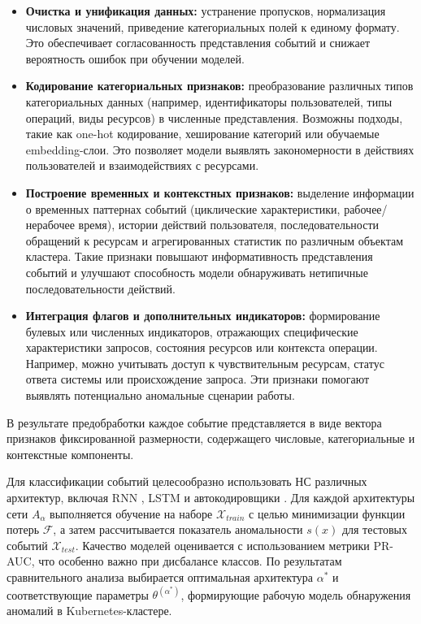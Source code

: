 \begin{itemize}
    \item \textbf{Очистка и унификация данных:} устранение пропусков, нормализация числовых значений, приведение категориальных полей к единому формату. Это обеспечивает согласованность представления событий и снижает вероятность ошибок при обучении моделей.

    \item \textbf{Кодирование категориальных признаков:} преобразование различных типов категориальных данных (например, идентификаторы пользователей, типы операций, виды ресурсов) в численные представления. Возможны подходы, такие как one-hot кодирование, хеширование категорий или обучаемые embedding-слои. Это позволяет модели выявлять закономерности в действиях пользователей и взаимодействиях с ресурсами.

    \item \textbf{Построение временных и контекстных признаков:} выделение информации о временных паттернах событий (циклические характеристики, рабочее/нерабочее время), истории действий пользователя, последовательности обращений к ресурсам и агрегированных статистик по различным объектам кластера. Такие признаки повышают информативность представления событий и улучшают способность модели обнаруживать нетипичные последовательности действий.

    \item \textbf{Интеграция флагов и дополнительных индикаторов:} формирование булевых или численных индикаторов, отражающих специфические характеристики запросов, состояния ресурсов или контекста операции. Например, можно учитывать доступ к чувствительным ресурсам, статус ответа системы или происхождение запроса. Эти признаки помогают выявлять потенциально аномальные сценарии работы.

\end{itemize}

В результате предобработки каждое событие представляется в виде вектора признаков фиксированной размерности, содержащего числовые, категориальные и контекстные компоненты.

Для классификации событий целесообразно использовать НС различных архитектур, включая RNN \cite{RNN}, LSTM \cite{LSTM} и автокодировщики \cite{AE}. Для каждой архитектуры сети $A_\alpha$ выполняется обучение на наборе $\mathcal{X}_{train}$ с целью минимизации функции потерь $\mathcal{F}$, а затем рассчитывается показатель аномальности $s(x)$ для тестовых событий $\mathcal{X}_{test}$. Качество моделей оценивается с использованием метрики PR-AUC, что особенно важно при дисбалансе классов. По результатам сравнительного анализа выбирается оптимальная архитектура $\alpha^*$ и соответствующие параметры $\theta^(\alpha^*)$, формирующие рабочую модель обнаружения аномалий в Kubernetes-кластере.